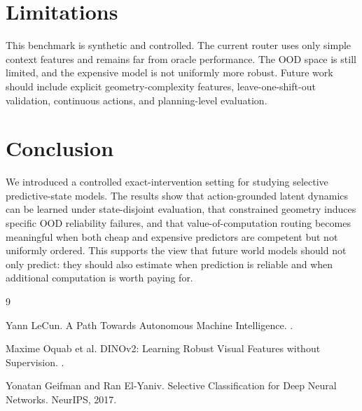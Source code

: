 \documentclass[10pt]{article}
\begin{document}


\FloatBarrier

\section{Limitations}

This benchmark is synthetic and controlled.
The current router uses only simple context features and remains far from oracle performance.
The OOD space is still limited, and the expensive model is not uniformly more robust.
Future work should include explicit geometry-complexity features, leave-one-shift-out validation, continuous actions, and planning-level evaluation.

\section{Conclusion}

We introduced a controlled exact-intervention setting for studying selective predictive-state models.
The results show that action-grounded latent dynamics can be learned under state-disjoint evaluation, that constrained geometry induces specific OOD reliability failures, and that value-of-computation routing becomes meaningful when both cheap and expensive predictors are competent but not uniformly ordered.
This supports the view that future world models should not only predict: they should also estimate when prediction is reliable and when additional computation is worth paying for.

\FloatBarrier


\begin{thebibliography}{9}

Yann LeCun.
\newblock A Path Towards Autonomous Machine Intelligence.
.

Maxime Oquab et al.
\newblock DINOv2: Learning Robust Visual Features without Supervision.
.

Yonatan Geifman and Ran El-Yaniv.
\newblock Selective Classification for Deep Neural Networks.
\newblock NeurIPS, 2017.

\end{thebibliography}
\end{document}
